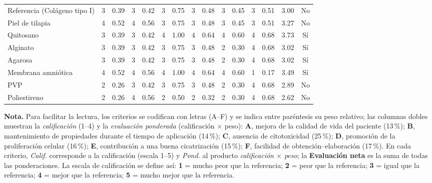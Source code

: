 \documentclass[../../DocumentoCompleto.tex]{subfiles}
\begin{document}
{\begin{longtable}{C{3.0cm} *{12}{c} cc}
		Referencia (Colágeno tipo I) & 3 & 0.39 & 3 & 0.42 & 3 & 0.75 & 3 & 0.48 & 3 & 0.45 & 3 & 0.51 & 3.00 & No \\
		Piel de tilapia              & 4 & 0.52 & 4 & 0.56 & 3 & 0.75 & 3 & 0.48 & 3 & 0.45 & 3 & 0.51 & 3.27 & No \\
		Quitosano                    & 3 & 0.39 & 3 & 0.42 & 4 & 1.00 & 4 & 0.64 & 4 & 0.60 & 4 & 0.68 & 3.73 & Sí \\
		Alginato                     & 3 & 0.39 & 3 & 0.42 & 3 & 0.75 & 3 & 0.48 & 2 & 0.30 & 4 & 0.68 & 3.02 & Sí \\
		Agarosa                      & 3 & 0.39 & 3 & 0.42 & 3 & 0.75 & 3 & 0.48 & 2 & 0.30 & 4 & 0.68 & 3.02 & Sí \\
		Membrana amniótica           & 4 & 0.52 & 4 & 0.56 & 4 & 1.00 & 4 & 0.64 & 4 & 0.60 & 1 & 0.17 & 3.49 & Sí \\
		PVP                          & 2 & 0.26 & 3 & 0.42 & 3 & 0.75 & 3 & 0.48 & 2 & 0.30 & 4 & 0.68 & 2.89 & No \\
		Poliestireno                 & 2 & 0.26 & 4 & 0.56 & 2 & 0.50 & 2 & 0.32 & 2 & 0.30 & 4 & 0.68 & 2.62 & No \\
		\bottomrule
	\end{longtable}
} %

\vspace{-0.4em}
\begin{center}
	\begin{minipage}{0.95\textwidth}
		\centering
		\normalsize
		\textbf{Nota.} Para facilitar la lectura, los criterios se codifican con letras (A–F) y se indica entre paréntesis su peso relativo; las columnas dobles muestran la \textit{calificación} (1–4) y la \textit{evaluación ponderada} (calificación $\times$ peso): 
		\textbf{A}, mejora de la calidad de vida del paciente (13\,\%); 
		\textbf{B}, mantenimiento de propiedades durante el tiempo de aplicación (14\,\%); 
		\textbf{C}, ausencia de citotoxicidad (25\,\%); 
		\textbf{D}, promoción de la proliferación celular (16\,\%); 
		\textbf{E}, contribución a una buena cicatrización (15\,\%); 
		\textbf{F}, facilidad de obtención–elaboración (17\,\%). En cada criterio, \textit{Calif.} corresponde a la calificación (escala 1–5) y \textit{Pond.} al producto \emph{calificación $\times$ peso}; la \textbf{Evaluación neta} es la suma de todas las ponderaciones. 
		La escala de calificación se define así: \textbf{1} = mucho peor que la referencia; \textbf{2} = peor que la referencia; \textbf{3} = igual que la referencia; \textbf{4} = mejor que la referencia; \textbf{5} = mucho mejor que la referencia.
	\end{minipage}
\end{center}
\end{document}
